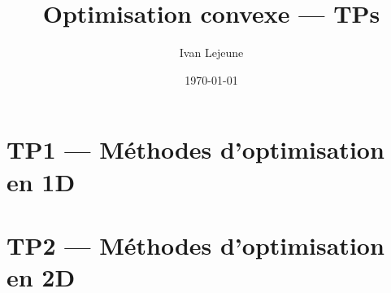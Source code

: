 \documentclass[french,a4paper,10pt]{article}
\title{\color{astral} \sffamily \bfseries Optimisation convexe --- TPs}
\author{Ivan Lejeune}
\date{\today}
\begin{document}
    \maketitle
    \tableofcontents
    
    \newpage
    \section*{TP1 --- Méthodes d'optimisation en 1D}\label{sec:TD1}
    \setcounter{section}{1}
    \setcounter{tdcounter}{0}
    

    \setcounter{subsection}{0}
    \newpage
    \section*{TP2 --- Méthodes d'optimisation en 2D}\label{sec:TD2}
    \setcounter{section}{2}
    \setcounter{tdcounter}{0}
    
\end{document}
